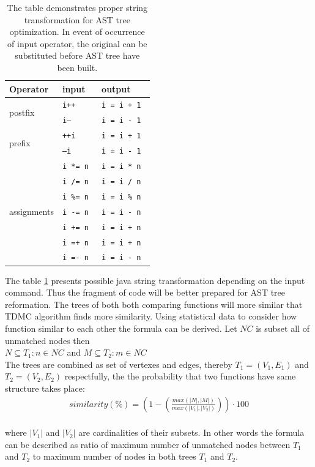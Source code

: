 \documentclass{report}
\begin{document}
\begin{table}[h]
\centering 
\begin{tabular}{|l|l|l|}
\hline
     Operator                        & input   & output     \\ \hline
\multirow{2}{*}{postfix}     & \texttt{i++}     & \texttt{i = i + 1  }  \\ \cline{2-3} 
                             & \texttt{i--}     & \texttt{i = i - 1  }  \\ \hline
\multirow{2}{*}{prefix}      & \texttt{++i}     & \texttt{i = i + 1 }   \\ \cline{2-3} 
                             & \texttt{--i }    & \texttt{i = i - 1}    \\ \hline
\multirow{7}{*}{assignments} & \texttt{i *= n } & \texttt{i = i * n } \\ \cline{2-3} 
                             & \texttt{i /= n  }& \texttt{i = i / n } \\ \cline{2-3} 
                             & \texttt{i \%= n }& \texttt{i = i \% n }\\ \cline{2-3} 
                             & \texttt{i -= n } & \texttt{i = i - n } \\ \cline{2-3} 
                             & \texttt{i += n  }& \texttt{i = i + n } \\ \cline{2-3} 
                             & \texttt{i =+ n } & \texttt{i = i + n}  \\ \cline{2-3} 
                             & \texttt{i =- n } & \texttt{i = i - n } \\ \hline
\end{tabular}
\caption{The table demonstrates proper string transformation for AST tree optimization. In event of occurrence  of input operator, the original can be substituted before AST tree have been built.}
\label{table:operators}
\end{table}

The table \ref{table:operators} presents possible java string transformation depending on the input command. Thus the fragment of code will be better prepared for AST tree reformation. The trees of both both comparing functions will more similar that TDMC algorithm finds more similarity. Using statistical data to consider how function similar to each other the formula can be derived. Let $NC$ is subset all of unmatched nodes then\\
$ N \subseteq T_{1}: n \in NC $ and $ M \subseteq T_{2}: m \in NC $ \\
The trees are combined as set of vertexes and edges, thereby $T_{1} = (V_{1}, E_{1})$ and $T_{2} = (V_{2}, E_{2})$ respectfully, the the probability that two functions have same structure takes place: \\
\begin{gather*}
similarity(\%) =  \left ( 1 - \left (\frac{max(|N|, |M|)}{max(|V_{1}|, |V_{2}|)} \right ) \right )\cdot 100 
\end{gather*} \\
where $|V_{1}|$ and $|V_{2}|$ are cardinalities of their subsets. In other words the formula can be described as ratio of maximum number of unmatched nodes between $T_{1}$ and $T_{2}$ to maximum number of nodes in both trees $T_{1}$ and $T_{2}$. 
\end{document}
